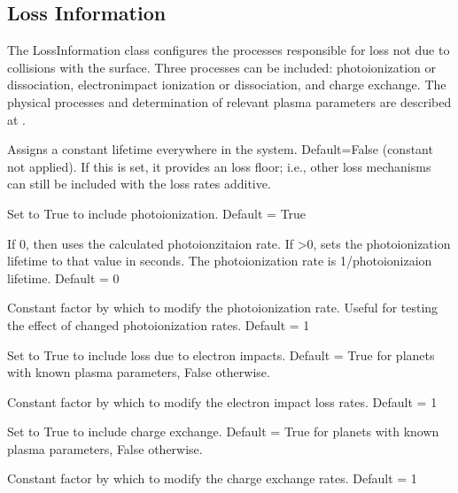 \documentclass[letterpaper,10pt,english]{sphinxmanual}
\begin{document}
\subsection{Loss Information}
\label{\detokenize{nexoclom2/inputfiles:loss-information}}\label{\detokenize{nexoclom2/inputfiles:lossinfo}}
\sphinxAtStartPar
The LossInformation class configures the processes responsible for loss not due
to collisions with the surface. Three processes can be included: photoionization
or dissociation, electron\sphinxhyphen{}impact ionization or dissociation, and charge exchange.
The physical processes and determination of relevant plasma parameters are
described at {\hyperref[\detokenize{nexoclom2/lossrates:lossrates}]{}}.
\begin{description}
\sphinxAtStartPar
Assigns a constant lifetime everywhere in the system. Default=False
(constant not applied). If this is set, it provides an loss floor; i.e.,
other loss mechanisms can still be included with the loss rates additive.

\sphinxAtStartPar
Set to True to include photoionization. Default = True

\sphinxAtStartPar
If 0, then uses the calculated photoionzitaion rate. If \textgreater{}0, sets the
photoionization lifetime to that value in seconds. The photoionization rate
is 1/photoionizaion lifetime. Default = 0

\sphinxAtStartPar
Constant factor by which to modify the photoionization rate. Useful for
testing the effect of changed photoionization rates. Default = 1

\sphinxAtStartPar
Set to True to include loss due to electron impacts. Default = True for
planets with known plasma parameters, False otherwise.

\sphinxAtStartPar
Constant factor by which to modify the electron impact loss rates.
Default = 1

\sphinxAtStartPar
Set to True to include charge exchange. Default = True for planets with
known plasma parameters, False otherwise.

\sphinxAtStartPar
Constant factor by which to modify the charge exchange rates. Default = 1

\end{description}
\end{document}
